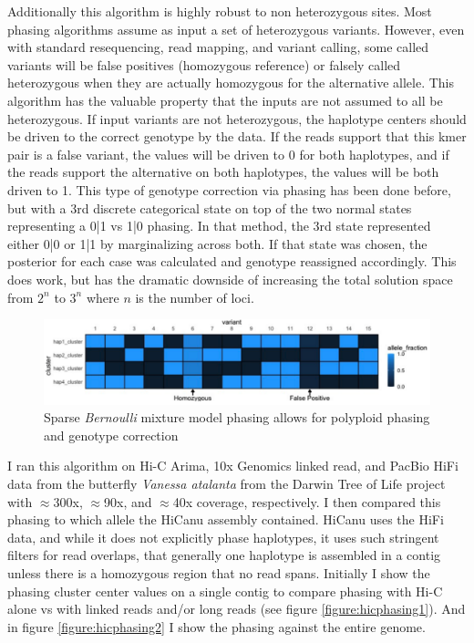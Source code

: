 \par{
Additionally this algorithm is highly robust to non heterozygous sites. Most phasing algorithms assume as input a set of heterozygous variants. However, even with standard resequencing, read mapping, and variant calling, some called variants will be false positives (homozygous reference) or falsely called heterozygous when they are actually homozygous for the alternative allele. This algorithm has the valuable property that the inputs are not assumed to all be heterozygous. If input variants are not heterozygous, the haplotype centers should be driven to the correct genotype by the data. If the reads support that this kmer pair is a false variant, the values will be driven to 0 for both haplotypes, and if the reads support the alternative on both haplotypes, the values will be both driven to 1. This type of genotype correction via phasing has been done before, but with a 3rd discrete categorical state on top of the two normal states representing a 0|1 vs 1|0 phasing\cite{mypatent}. In that method, the 3rd state represented either 0|0 or 1|1 by marginalizing across both. If that state was chosen, the posterior for each case was calculated and genotype reassigned accordingly. This does work, but has the dramatic downside of increasing the total solution space from $2^n$ to $3^n$ where $n$ is the number of loci.
} 


\begin{figure}[htbp!]
\caption{Sparse \textit{Bernoulli} mixture model phasing allows for polyploid phasing and genotype correction}
\label{figure:bernoulli}
\begin{centering}
\includegraphics[width=\textwidth]{poly.png}
\end{centering}

\end{figure}


\par{
I ran this algorithm on Hi-C Arima, 10x Genomics linked read, and PacBio HiFi data from the butterfly \textit{Vanessa atalanta} from the Darwin Tree of Life project with $\approx$300x, $\approx$90x, and $\approx$40x coverage, respectively. I then compared this phasing to which allele the HiCanu assembly contained. HiCanu uses the HiFi data, and while it does not explicitly phase haplotypes, it uses such stringent filters for read overlaps, that generally one haplotype is assembled in a contig unless there is a homozygous region that no read spans. Initially I show the phasing cluster center values on a single contig to compare phasing with Hi-C alone vs with linked reads and/or long reads (see figure \ref{figure:hicphasing1}). And in figure \ref{figure:hicphasing2} I show the phasing against the entire genome.
}

